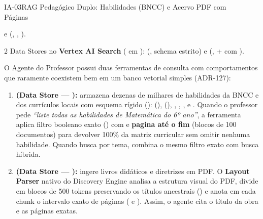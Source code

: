\begin{pecaarq}{IA-03}{RAG Pedagógico Duplo: Habilidades (BNCC) e Acervo PDF com Páginas}{\sgcp~\nativo\enspace\saws~\adaptacao\enspace\sazure~\adaptacao}
\begin{campos}
  \item[Código de busca]  e  (, , ).
  \item[Configuração GCP] 2 Data Stores no \textbf{Vertex AI Search} ( em ):  (, schema estrito) e  (,  +  com ).
  \item[Como é hoje (GCP)] O Agente do Professor possui duas ferramentas de consulta com comportamentos que raramente coexistem bem em um banco vetorial simples (ADR-127):
  \begin{enumerate}
    \item \textbf{ (Data Store  --- ):} armazena dezenas de milhares de habilidades da BNCC e dos currículos locais com esquema rígido ():  (),  (\cd{["6º ano"]}), , , ,  e . Quando o professor pede \emph{``liste todas as habilidades de Matemática do 6º ano''}, a ferramenta aplica filtro booleano exato () com  e \textbf{pagina até o fim} (blocos de 100 documentos) para devolver 100\% da matriz curricular sem omitir nenhuma habilidade. Quando busca por tema, combina o mesmo filtro exato com busca híbrida.
    \item \textbf{ (Data Store  --- ):} ingere livros didáticos e diretrizes em PDF. O \textbf{Layout Parser} nativo do Discovery Engine analisa a estrutura visual do PDF, divide em blocos de 500 tokens preservando os títulos ancestrais () e anota em cada chunk o intervalo exato de páginas ( e ). Assim, o agente cita o título da obra e as páginas exatas.
  \end{enumerate}

\end{campos}
\end{pecaarq}
